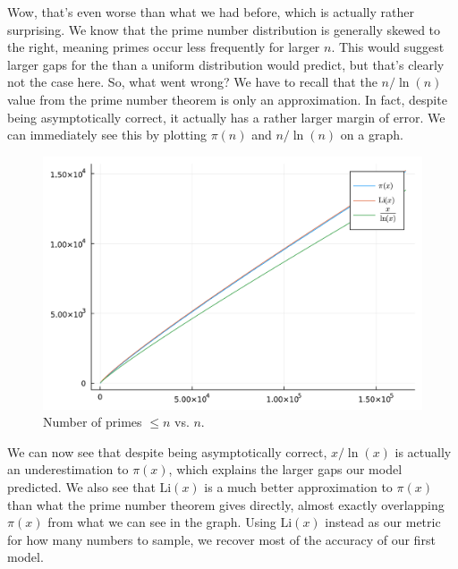 \documentclass[conference]{IEEEtran}
\begin{document}
Wow, that's even worse than what we had before, which is actually rather surprising.
We know that the prime number distribution is generally skewed to the right, meaning
primes occur less frequently for larger $n$. This would suggest larger gaps for the
than a uniform distribution would predict, but that's clearly not the case here. So,
what went wrong? We have to recall that the $n/\ln(n)$ value
from the prime number theorem is only an approximation. In fact, despite being
asymptotically correct, it actually has a rather larger margin of error. We
can immediately see this by plotting $\pi(n)$ and $n/\ln(n)$ on a graph.

\begin{figure}[H]
  \centering
  \includegraphics[width=\linewidth,keepaspectratio]{pmt_comparison.pdf}
  \caption{Number of primes $\le n$ vs. $n$.}
\end{figure}

We can now see that despite being asymptotically correct,
$x/\ln(x)$ is actually an underestimation to
$\pi(x)$, which explains the larger gaps our model
predicted. We also see that $\mathrm{Li}(x)$ is a much
better approximation to $\pi(x)$ than what the prime
number theorem gives directly, almost exactly overlapping
$\pi(x)$ from what we can see in the graph. Using
$\mathrm{Li}(x)$ instead as our metric for how many
numbers to sample, we recover most of the accuracy of our
first model.
\end{document}
